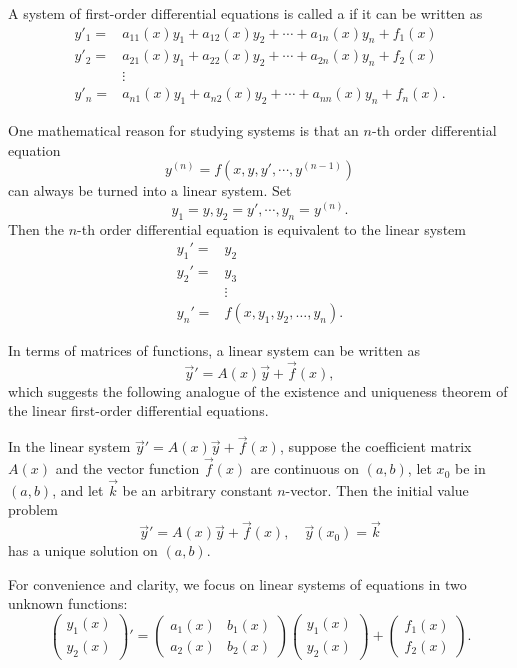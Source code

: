 A system of first-order differential equations is called a  if it can be written as
\[
  \begin{aligned}
    y'_1=&a_{11}(x)y_1+a_{12}(x)y_2+\cdots+a_{1n}(x)y_n+f_1(x)\\ 
    y'_2=&a_{21}(x)y_1+a_{22}(x)y_2+\cdots+a_{2n}(x)y_n+f_2(x)\\
    &\vdots\\ 
    y'_n=&a_{n1}(x)y_1+a_{n2}(x)y_2+\cdots+a_{nn}(x)y_n+f_n(x).
  \end{aligned}
\]

One mathematical reason for studying systems is that an $n$-th order differential equation
\[y^{(n)}=f(x, y, y',\cdots, y^{(n-1)})\]
can always be turned into a linear system. Set
\[y_1=y, y_2=y', \cdots, y_n=y^{(n)}.\]
Then the $n$-th order differential equation is equivalent to the linear system
\[
  \begin{aligned}
    y_{1}'=&y_2 \\
    y_{2}'=&y_3\\
    & \vdots \\
    y_{n}'=&f\left(x, y_{1}, y_{2}, \ldots, y_{n}\right).
    \end{aligned}  
\]

In terms of matrices of functions, a linear system can be written as
\[\vec{y}'=A(x)\vec{y}+\vec{f}(x),\]
which suggests the following analogue of the existence and uniqueness theorem of the linear first-order differential equations.

\begin{theorem}
  In the linear system $\vec{y}'=A(x)\vec{y}+\vec{f}(x)$,
suppose the coefficient matrix $A(x)$ and the vector function $\vec{f}(x)$ are continuous on $(a,b)$, let $x_0$ be in $(a,b)$, and let $\vec{k}$ be an arbitrary constant $n$-vector. Then the initial value problem
    \[\vec{y}'=A(x)\vec{y}+\vec{f}(x), \quad \vec{y}(x_0)=\vec{k} \nonumber\]
  has a unique solution on $(a,b)$.
\end{theorem}

For convenience and clarity, we focus on linear systems of equations in two
unknown functions:
\begin{equation}\label{eq:hom-linear-two}
  \begin{pmatrix}
    y_1(x) \\ y_2(x)
  \end{pmatrix}'=
  \begin{pmatrix}
    a_1(x) & b_1(x)\\
    a_2(x) & b_2(x)
  \end{pmatrix}
  \begin{pmatrix}
    y_1(x) \\ y_2(x)
  \end{pmatrix}
  +
  \begin{pmatrix}
    f_1(x)\\ f_2(x)
  \end{pmatrix}.
\end{equation}


